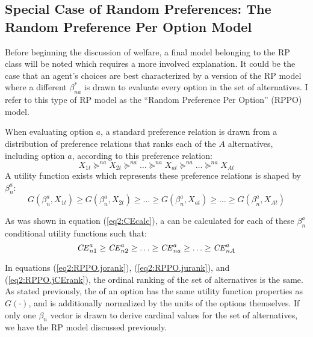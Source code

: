 \documentclass[../main.tex]{subfiles}
\begin{document}
\singlespacing
\subsection{Special Case of Random Preferences: The Random Preference Per Option Model}
\doublespacing

Before beginning the discussion of welfare, a final model belonging to the RP class will be noted which requires a more involved explanation.
It could be the case that an agent's choices are best characterized by a version of the RP model where a different $\beta^*_{na}$ is drawn to evaluate every option in the set of alternatives.
I refer to this type of RP model as the \enquote{Random Preference Per Option} (RPPO) model.

When evaluating option $a$, a standard preference relation is drawn from a distribution of preference relations that ranks each of the $A$ alternatives, including option $a$, according to this preference relation:
\begin{equation}
	\label{eq2:RPPO.jorank}
	X_{1t} \succcurlyeq^{na} X_{2t} \succcurlyeq^{na} \ldots \succcurlyeq^{na} X_{at} \succcurlyeq^{na} \ldots \succcurlyeq^{na} X_{At}
\end{equation}
\noindent A utility function exists which represents these preference relations is shaped by $\beta_n^a$:
\begin{equation}
	\label{eq2:RPPO.jurank}
	G(\beta_n^a,X_{1t}) \geq G(\beta_n^a,X_{2t}) \geq \ldots \geq G(\beta_n^a,X_{at}) \geq \ldots \geq G(\beta_n^a,X_{At})
\end{equation}

As was shown in equation (\ref{eq2:CEcalc}), a {\CE} can be calculated for each of these $\beta_n^a$ conditional utility functions such that:
\begin{equation}
	\label{eq2:RPPO.jCErank}
	{\ensuremath{\mathit{CE}}}^a_{n1} \geq {\ensuremath{\mathit{CE}}}^a_{n2} \geq \ldots \geq {\ensuremath{\mathit{CE}}}^a_{na} \geq \ldots \geq {\ensuremath{\mathit{CE}}}^a_{nA}
\end{equation}

In equations (\ref{eq2:RPPO.jorank}), (\ref{eq2:RPPO.jurank}), and (\ref{eq2:RPPO.jCErank}), the ordinal ranking of the set of alternatives is the same.
As stated previously, the {\CE} of an option has the same utility function properties as $G(\cdot)$, and is additionally normalized by the units of the options themselves.
If only one $\beta_n$ vector is drawn to derive cardinal values for the set of alternatives, we have the RP model discussed previously.
\end{document}
